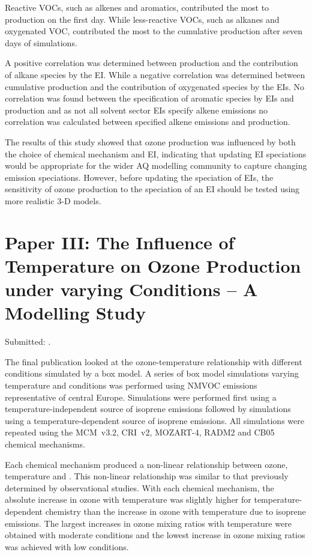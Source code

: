 Reactive VOCs, such as alkenes and aromatics, contributed the most to  production on the first day.
While less-reactive VOCs, such as alkanes and oxygenated VOC, contributed the most to the cumulative  production after seven days of simulations. 

A positive correlation was determined between  production and the contribution of alkane species by the EI.
While a negative correlation was determined between cumulative  production and the contribution of oxygenated species by the EIs.
No correlation was found between the specification of aromatic species by EIs and  production and as not all solvent sector EIs specify alkene emissions no correlation was calculated between specified alkene emissions and  production.

The results of this study showed that ozone production was influenced by both the choice of chemical mechanism and EI, indicating that updating EI speciations would be appropriate for the wider AQ modelling community to capture changing emission speciations.
However, before updating the speciation of EIs, the sensitivity of ozone production to the speciation of an EI should be tested using more realistic 3-D models.

\vspace{-2mm}
\singlespacing
\section{Paper III: The Influence of Temperature on Ozone Production under varying  Conditions -- A Modelling Study} \label{s:T-O3_results}
\onehalfspacing

\vspace{-2mm}
\noindent
Submitted: .
\vspace{3mm}

The final publication looked at the ozone-temperature relationship with different  conditions simulated by a box model.
A series of box model simulations varying temperature and  conditions was performed using NMVOC emissions representative of central Europe. 
Simulations were performed first using a temperature-independent source of isoprene emissions followed by simulations using a temperature-dependent source of isoprene emissions.
All simulations were repeated using the MCM~v3.2, CRI~v2, MOZART-4, RADM2 and CB05 chemical mechanisms.

Each chemical mechanism produced a non-linear relationship between ozone, temperature and .
This non-linear relationship was similar to that previously determined by observational studies.  
With each chemical mechanism, the absolute increase in ozone with temperature was slightly higher for temperature-dependent chemistry than the increase in ozone with temperature due to isoprene emissions.
The largest increases in ozone mixing ratios with temperature were obtained with moderate  conditions and the lowest increase in ozone mixing ratios was achieved with low  conditions.

